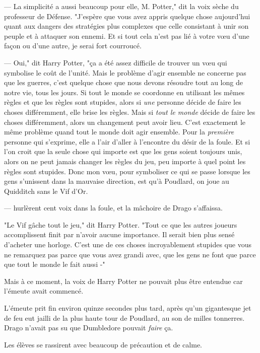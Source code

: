 --- La simplicité a aussi beaucoup pour elle, M. Potter," dit la voix sèche du professeur de Défense. "J'espère que vous avez appris quelque chose aujourd'hui quant aux dangers des stratégies plus complexes que celle consistant à unir son peuple et à attaquer son ennemi. Et si tout cela n'est pas lié à votre vœu d'une façon ou d'une autre, je serai fort courroucé.

--- Oui," dit Harry Potter, "ça a été assez difficile de trouver un vœu qui symbolise le coût de l'unité. Mais le problème d'agir ensemble ne concerne pas que les guerres, c'est quelque chose que nous devons résoudre tout au long de notre vie, tous les jours. Si tout le monde se coordonne en utilisant les mêmes règles et que les règles sont stupides, alors si \emph{une} personne décide de faire les choses différemment, elle brise les règles. Mais si \emph{tout le monde} décide de faire les choses différemment, alors un changement peut avoir lieu. C'est exactement le même problème quand tout le monde doit agir ensemble. Pour la \emph{première} personne qui s'exprime, elle a l'air d'aller à l'encontre du désir de la foule. Et si l'on croit que la seule chose qui importe est que les gens soient toujours unis, alors on ne peut jamais changer les règles du jeu, peu importe à quel point les règles sont stupides. Donc mon vœu, pour symboliser ce qui se passe lorsque les gens s'unissent dans la mauvaise direction, est qu'à Poudlard, on joue au Quidditch sans le Vif d'Or.

---  hurlèrent cent voix dans la foule, et la mâchoire de Drago s'affaissa.

"Le Vif gâche tout le jeu," dit Harry Potter. "Tout ce que les autres joueurs accomplissent finit par n'avoir aucune importance. Il serait bien plus sensé d'acheter une horloge. C'est une de ces choses incroyablement stupides que vous ne remarquez pas parce que vous avez grandi avec, que les gens ne font que parce que tout le monde le fait aussi -"

Mais à ce moment, la voix de Harry Potter ne pouvait plus être entendue car l'émeute avait commencé.

\later

L'émeute prit fin environ quinze secondes plus tard, après qu'un gigantesque jet de feu eut jailli de la plus haute tour de Poudlard, au son de milles tonnerres. Drago n'avait pas su que Dumbledore pouvait \emph{faire} ça.

Les élèves se rassirent avec beaucoup de précaution et de calme.

